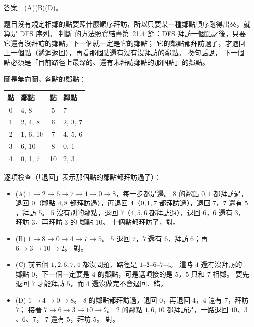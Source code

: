 \begin{pastsoln}
答案：(A)(B)(D)。

題目沒有規定相鄰的點要照什麼順序拜訪，所以只要某一種鄰點順序跑得出來，就算是 DFS 序列。 判斷
的方法照資結書第~21.4~節：DFS 拜訪一個點之後，只要它還有沒拜訪的鄰點，下一個就一定是它的鄰點；
它的鄰點都拜訪過了，才退回上一個點（遞迴返回），再看那個點還有沒有沒拜訪的鄰點。 換句話說，
下一個點必須是「目前路徑上最深的、還有未拜訪鄰點的那個點」的鄰點。

圖是無向圖，各點的鄰點：
\begin{center}
\small
\begin{tabular}{cl@{\qquad}cl}
\toprule
點 & 鄰點 & 點 & 鄰點 \\
\midrule
0 & 4, 8 & 5 & 7 \\
1 & 2, 4, 8 & 6 & 2, 3, 7 \\
2 & 1, 6, 10 & 7 & 4, 5, 6 \\
3 & 6, 10 & 8 & 0, 1 \\
4 & 0, 1, 7 & 10 & 2, 3 \\
\bottomrule
\end{tabular}
\end{center}

逐項檢查（「退回」表示那個點的鄰點都拜訪過了）：
\begin{itemize}
\item (A) $1 \to 2 \to 6 \to 7 \to 4 \to 0 \to 8$，每一步都是邊。 $8$ 的鄰點 $0, 1$ 都拜訪過，退回
$0$（鄰點 $4, 8$ 都拜訪過），再退回 $4$（$0, 1, 7$ 都拜訪過），退回 $7$，$7$ 還有 $5$，拜訪 $5$。
$5$ 沒有別的鄰點，退回 $7$（$4, 5, 6$ 都拜訪過），退回 $6$，$6$ 還有 $3$，拜訪 $3$，再拜訪 $3$ 的
鄰點 $10$。 十個點都拜訪了，對。
\item (B) $1 \to 8 \to 0 \to 4 \to 7 \to 5$。 $5$ 退回 $7$，$7$ 還有 $6$，拜訪 $6$；再
$6 \to 3 \to 10 \to 2$。 對。
\item (C) 前五個 $1, 2, 6, 7, 4$ 都沒問題，路徑是 $1$--$2$--$6$--$7$--$4$。 這時 $4$ 還有沒拜訪的
鄰點 $0$，下一個一定要是 $4$ 的鄰點，可是選項接的是 $5$，$5$ 只和 $7$ 相鄰。 要先退回 $7$ 才能拜訪
$5$，而 $4$ 還沒做完不會退回，錯。
\item (D) $1 \to 4 \to 0 \to 8$。 $8$ 的鄰點都拜訪過，退回 $0$，再退回 $4$，$4$ 還有 $7$，拜訪 $7$；
接著 $7 \to 6 \to 3 \to 10 \to 2$。 $2$ 的鄰點 $1, 6, 10$ 都拜訪過，一路退回 $10$、$3$、$6$、$7$，
$7$ 還有 $5$，拜訪 $5$。 對。
\end{itemize}
\end{pastsoln}
